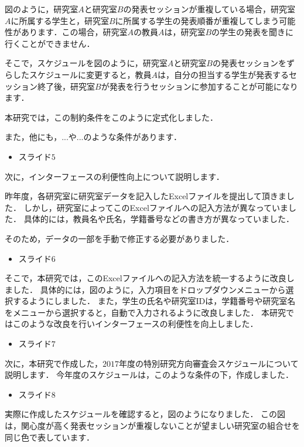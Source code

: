 \documentclass[a4j]{jarticle}
\begin{document}
図のように，研究室$A$と研究室$B$の発表セッションが重複している場合，研究室$A$に所属する学生と，研究室$B$に所属する学生の発表順番が重複してしまう可能性があります．この場合，研究室$A$の教員$A$は，研究室$B$の学生の発表を聞きに行くことができません．

そこで，スケジュールを図のように，研究室$A$と研究室$B$の発表セッションをずらしたスケジュールに変更すると，教員$A$は，自分の担当する学生が発表するセッション終了後，研究室$B$が発表を行うセッションに参加することが可能になります．

本研究では，この制約条件をこのように定式化しました．

また，他にも，...や...のような条件があります．

\begin{itemize}
\item スライド$5$
\end{itemize}
次に，インターフェースの利便性向上について説明します．

昨年度，各研究室に研究室データを記入したExcelファイルを提出して頂きました．
しかし，研究室によってこのExcelファイルへの記入方法が異なっていました．
具体的には，教員名や氏名，学籍番号などの書き方が異なっていました．

そのため，データの一部を手動で修正する必要がありました．

%

\begin{itemize}
\item スライド$6$
\end{itemize}
そこで，本研究では，このExcelファイルへの記入方法を統一するように改良しました．
具体的には，図のように，入力項目をドロップダウンメニューから選択するようにしました．
また，学生の氏名や研究室IDは，学籍番号や研究室名をメニューから選択すると，自動で入力されるように改良しました．
本研究ではこのような改良を行いインターフェースの利便性を向上しました．
%
\\

\begin{itemize}
\item スライド$7$
\end{itemize}
次に，本研究で作成した，$2017$年度の特別研究方向審査会スケジュールについて説明します．
今年度のスケジュールは，このような条件の下，作成しました．

\begin{itemize}
\item スライド$8$
\end{itemize}
実際に作成したスケジュールを確認すると，図のようになりました．
この図は，関心度が高く発表セッションが重複しないことが望ましい研究室の組合せを同じ色で表しています．
\end{document}
